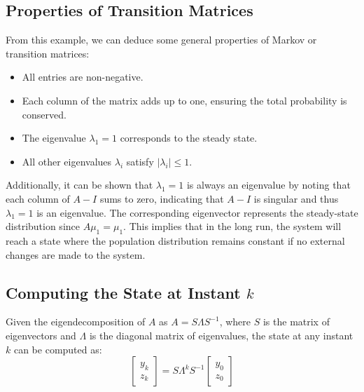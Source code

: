 \subsection*{Properties of Transition Matrices}

From this example, we can deduce some general properties of Markov or transition matrices:
\begin{itemize}
    \item All entries are non-negative.
    \item Each column of the matrix adds up to one, ensuring the total probability is conserved.
    \item The eigenvalue $\lambda_1 = 1$ corresponds to the steady state.
    \item All other eigenvalues $\lambda_i$ satisfy $|\lambda_i| \leq 1$.
\end{itemize}
Additionally, it can be shown that $\lambda_1 = 1$ is always an eigenvalue by noting that each column of $A - I$ sums to zero, indicating that $A - I$ is singular and thus $\lambda_1 = 1$ is an eigenvalue. The corresponding eigenvector represents the steady-state distribution since $A\mu_1 = \mu_1$. This implies that in the long run, the system will reach a state where the population distribution remains constant if no external changes are made to the system.

\subsection*{Computing the State at Instant \( k \)}

Given the eigendecomposition of \( A \) as \( A = S \Lambda S^{-1} \), where \( S \) is the matrix of eigenvectors and \( \Lambda \) is the diagonal matrix of eigenvalues, the state at any instant \( k \) can be computed as:
\begin{equation}
    \begin{bmatrix}
    y_k \\
    z_k 
    \end{bmatrix} = S \Lambda^k S^{-1}
    \begin{bmatrix}
    y_0 \\
    z_0 
    \end{bmatrix}
\end{equation}

